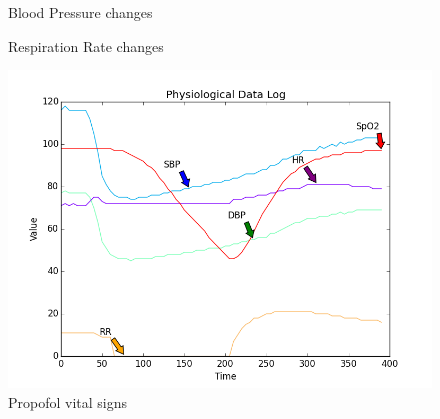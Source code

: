 \documentclass[a4paper]{article}
\begin{document}
\begin{figure}[!htb]\centering
   \begin{minipage}{0.49\textwidth}
     \caption{Blood Pressure changes}
     \label{fig:given 200 mg Propofol}
     
   \end{minipage}
   \begin {minipage}{0.49\textwidth}
     \caption{Respiration Rate changes}
     \label{fig:given 200 mg Propofol}
   \end{minipage}
\end{figure}

\begin{figure}[p]
    \includegraphics[width=1\textwidth]{cae_propofol_200mg.png}
    \caption{Propofol vital signs}
    \label{fig:awesome_image}
\end{figure}
\end{document}

